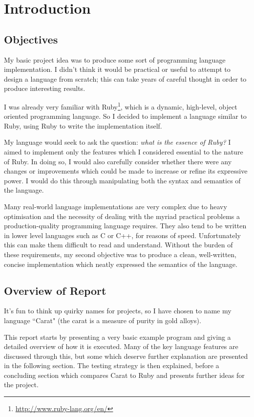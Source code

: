 \section{Introduction}

\subsection{Objectives}

My basic project idea was to produce some sort of programming language implementation. I didn't think it would be practical or useful to attempt to design a language from scratch; this can take years of careful thought in order to produce interesting results.

I was already very familiar with Ruby\footnote{\url{http://www.ruby-lang.org/en/}}, which is a dynamic, high-level, object oriented programming language. So I decided to implement a language similar to Ruby, using Ruby to write the implementation itself.

My language would seek to ask the question: \textit{what is the essence of Ruby?} I aimed to implement only the features which I considered essential to the nature of Ruby. In doing so, I would also carefully consider whether there were any changes or improvements which could be made to increase or refine its expressive power. I would do this through manipulating both the syntax and semantics of the language.

Many real-world language implementations are very complex due to heavy optimisation and the necessity of dealing with the myriad practical problems a production-quality programming language requires. They also tend to be written in lower level languages such as C or C++, for reasons of speed. Unfortunately this can make them difficult to read and understand. Without the burden of these requirements, my second objective was to produce a clean, well-written, concise implementation which neatly expressed the semantics of the language.

\subsection{Overview of Report}

It's fun to think up quirky names for projects, so I have chosen to name my language ``Carat" (the carat is a measure of purity in gold alloys).

This report starts by presenting a very basic example program and giving a detailed overview of how it is executed. Many of the key language features are discussed through this, but some which deserve further explanation are presented in the following section. The testing strategy is then explained, before a concluding section which compares Carat to Ruby and presents further ideas for the project.

